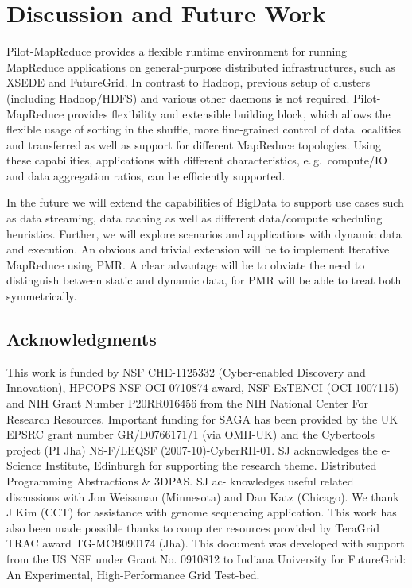 \documentclass{acm_proc_article-sp}
\newcommand{\pilotmapreduce}{Pilot-MapReduce\xspace}
\begin{document}
\section{Discussion and Future Work}
\label{sec-conclusion}

\pilotmapreduce provides a flexible runtime environment for running
MapReduce applications on general-purpose distributed infrastructures,
such as XSEDE and FutureGrid. In contrast to Hadoop, previous setup of
clusters (including Hadoop/HDFS) and various other daemons is not
required. Pilot-MapReduce provides flexibility and extensible building
block, which allows the flexible usage of sorting in the shuffle, more
fine-grained control of data localities and transferred as well as
support for different MapReduce topologies. Using these capabilities,
applications with different characteristics, e.\,g.\ compute/IO and
data aggregation ratios, can be efficiently supported.


In the future we will extend the capabilities of BigData to support
use cases such as data streaming, data caching as well as different
data/compute scheduling heuristics. Further, we will explore scenarios
and applications with dynamic data and execution.  An obvious and
trivial extension will be to implement Iterative MapReduce using PMR.
A clear advantage will be to obviate the need to distinguish between
static and dynamic data, for PMR will be able to treat both
symmetrically.



%
%
%


\subsection*{Acknowledgments}
\scriptsize This work is funded by NSF CHE-1125332 (Cyber-enabled
Discovery and Innovation), HPCOPS NSF-OCI 0710874 award, NSF-ExTENCI
(OCI-1007115) and NIH Grant Number P20RR016456 from the NIH National
Center For Research Resources. Important funding for SAGA has been
provided by the UK EPSRC grant number GR/D0766171/1 (via OMII-UK) and
the Cybertools project (PI Jha) NS-F/LEQSF (2007-10)-CyberRII-01. SJ
acknowledges the e-Science Institute, Edinburgh for supporting the
research theme. Distributed Programming Abstractions \& 3DPAS. SJ ac-
knowledges useful related discussions with Jon Weissman (Minnesota)
and Dan Katz (Chicago). We thank J Kim (CCT) for assistance with
genome sequencing application. This work has also been made possible
thanks to computer resources provided by TeraGrid TRAC award
TG-MCB090174 (Jha). This document was developed with support from the
US NSF under Grant No. 0910812 to Indiana University for FutureGrid:
An Experimental, High-Performance Grid Test-bed.
\end{document}
